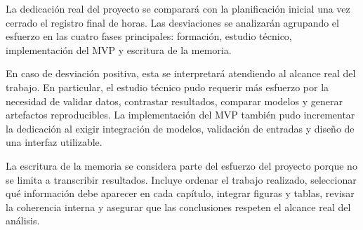 La dedicación real del proyecto se comparará con la planificación inicial una vez cerrado el registro final de horas. Las desviaciones se analizarán agrupando el esfuerzo en las cuatro fases principales: formación, estudio técnico, implementación del MVP y escritura de la memoria.

En caso de desviación positiva, esta se interpretará atendiendo al alcance real del trabajo. En particular, el estudio técnico pudo requerir más esfuerzo por la necesidad de validar datos, contrastar resultados, comparar modelos y generar artefactos reproducibles. La implementación del MVP también pudo incrementar la dedicación al exigir integración de modelos, validación de entradas y diseño de una interfaz utilizable.

La escritura de la memoria se considera parte del esfuerzo del proyecto porque no se limita a transcribir resultados. Incluye ordenar el trabajo realizado, seleccionar qué información debe aparecer en cada capítulo, integrar figuras y tablas, revisar la coherencia interna y asegurar que las conclusiones respeten el alcance real del análisis.